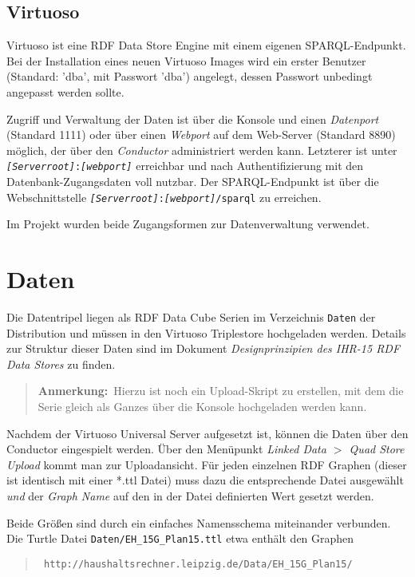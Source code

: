 \documentclass[a4paper,11pt,twoside]{article}
\newcommand{\Anmerkung}[1]{
  \begin{quote} \textbf{Anmerkung:}\ #1 \end{quote}
}
\begin{document}
\subsection{Virtuoso}

Virtuoso ist eine RDF Data Store Engine mit einem eigenen SPARQL-Endpunkt.
Bei der Installation eines neuen Virtuoso Images wird ein erster Benutzer
(Standard: 'dba', mit Passwort 'dba') angelegt, dessen Passwort unbedingt
angepasst werden sollte.

Zugriff und Verwaltung der Daten ist über die Konsole und einen
\emph{Datenport} (Standard 1111) oder über einen \emph{Webport} auf dem
Web-Server (Standard 8890) möglich, der über den \emph{Conductor}
administriert werden kann.  Letzterer ist unter
\texttt{\textit{[Serverroot]}:\textit{[webport]}} erreichbar und nach
Authentifizierung mit den Datenbank-Zugangsdaten voll nutzbar.  Der
SPARQL-Endpunkt ist über die Webschnittstelle
\texttt{\textit{[Serverroot]}:\textit{[webport]}/sparql} zu erreichen. 

Im Projekt wurden beide Zugangsformen zur Datenverwaltung verwendet. 

\section{Daten}

Die Datentripel liegen als RDF Data Cube Serien im Verzeichnis \texttt{Daten}
der Distribution und müssen in den Virtuoso Triplestore hochgeladen werden.
Details zur Struktur dieser Daten sind im Dokument \emph{Designprinzipien des
  IHR-15 RDF Data Stores} zu finden.

\Anmerkung{Hierzu ist noch ein Upload-Skript zu erstellen, mit dem die Serie
  gleich als Ganzes über die Konsole hochgeladen werden kann.}

Nachdem der Virtuoso Universal Server aufgesetzt ist, können die Daten über
den Conductor eingespielt werden. Über den Menüpunkt \textit{Linked Data $>$
  Quad Store Upload} kommt man zur Uploadansicht.  Für jeden einzelnen RDF
Graphen (dieser ist identisch mit einer *.ttl Datei) muss dazu die
entsprechende Datei ausgewählt \emph{und} der \textit{Graph Name} auf den in
der Datei definierten Wert gesetzt werden. 

Beide Größen sind durch ein einfaches Namensschema miteinander verbunden.  Die
Turtle Datei \texttt{Daten/EH\_15G\_Plan15.ttl} etwa enthält den Graphen 
\begin{quote}\tt
  http://haushaltsrechner.leipzig.de/Data/EH\_15G\_Plan15/
\end{quote}
\end{document}
